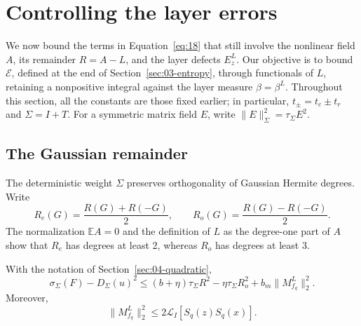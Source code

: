 \section{Controlling the layer errors}\label{sec:05-layers}

We now bound the terms in Equation~\eqref{eq:18} that still involve
the nonlinear field $A$, its remainder $R=A-L$, and the layer defects
$E_z^L$. Our objective is to bound $\mathcal E$, defined at the end of
Section~\ref{sec:03-entropy}, through functionals of $L$, retaining a
nonpositive integral against the layer measure $\beta=\beta^L$.
Throughout this section, all the constants are those fixed earlier;
in particular, \(t_\pm=t_c\pm t_r\) and \(\Sigma=I+T\).
For a symmetric matrix field \(E\), write
\(\|E\|_\Sigma^2=\tau_\Sigma E^2\).

\subsection{The Gaussian remainder}

The deterministic weight \(\Sigma\) preserves orthogonality of
Gaussian Hermite degrees.  Write
\[
 R_e(G)=\frac{R(G)+R(-G)}2,\qquad
 R_o(G)=\frac{R(G)-R(-G)}2.
\]
The normalization \(\mathbb E A=0\) and the definition of \(L\) as the
degree-one part of \(A\) show that \(R_e\) has degrees at least \(2\),
whereas \(R_o\) has degrees at least \(3\).

\begin{lemma}\label{lem:layers-gaussian}
With the notation of Section~\ref{sec:04-quadratic},
\begin{equation}
 \sigma_\Sigma(F)-D_\Sigma(u)^2
 \le (b+\eta)\tau_\Sigma R^2-\eta\tau_\Sigma R_o^2
       +b_m\|M_{f_q}^L\|_2^2.
 \tag{19}\label{eq:19}
\end{equation}
Moreover,
\[
 \|M_{f_q}^L\|_2^2
 \le 2\mathcal L_I[S_q(z)S_q(x)].
\]
\end{lemma}

